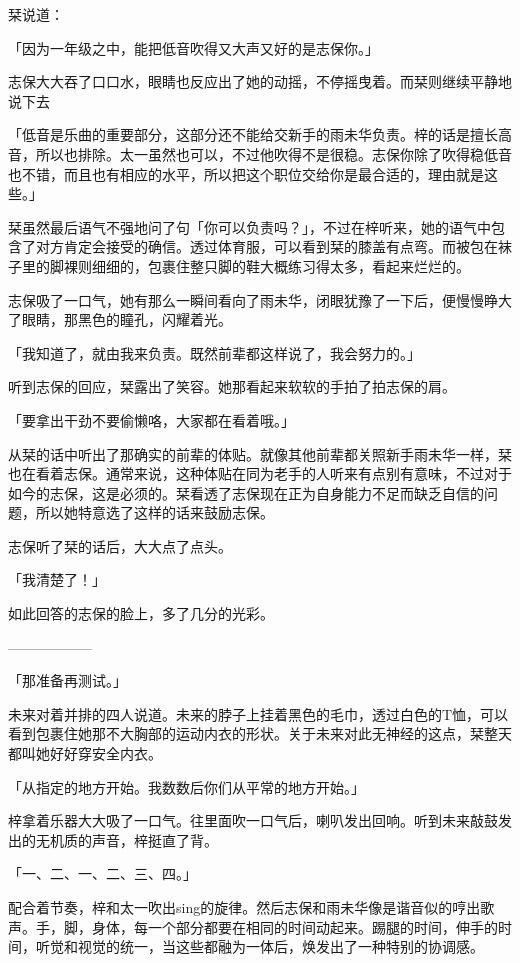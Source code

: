 \documentclass[UTF8]{ctexart}
\begin{document}
    栞说道：

    「因为一年级之中，能把低音吹得又大声又好的是志保你。」

    志保大大吞了口口水，眼睛也反应出了她的动摇，不停摇曳着。而栞则继续平静地说下去

    「低音是乐曲的重要部分，这部分还不能给交新手的雨未华负责。梓的话是擅长高音，所以也排除。太一虽然也可以，不过他吹得不是很稳。志保你除了吹得稳低音也不错，而且也有相应的水平，所以把这个职位交给你是最合适的，理由就是这些。」

    栞虽然最后语气不强地问了句「你可以负责吗？」，不过在梓听来，她的语气中包含了对方肯定会接受的确信。透过体育服，可以看到栞的膝盖有点弯。而被包在袜子里的脚裸则细细的，包裹住整只脚的鞋大概练习得太多，看起来烂烂的。

    志保吸了一口气，她有那么一瞬间看向了雨未华，闭眼犹豫了一下后，便慢慢睁大了眼睛，那黑色的瞳孔，闪耀着光。

    「我知道了，就由我来负责。既然前辈都这样说了，我会努力的。」

    听到志保的回应，栞露出了笑容。她那看起来软软的手拍了拍志保的肩。

    「要拿出干劲不要偷懒咯，大家都在看着哦。」

    从栞的话中听出了那确实的前辈的体贴。就像其他前辈都关照新手雨未华一样，栞也在看着志保。通常来说，这种体贴在同为老手的人听来有点别有意味，不过对于如今的志保，这是必须的。栞看透了志保现在正为自身能力不足而缺乏自信的问题，所以她特意选了这样的话来鼓励志保。

    志保听了栞的话后，大大点了点头。

    「我清楚了！」

    如此回答的志保的脸上，多了几分的光彩。

    ——————

    「那准备再测试。」

    未来对着并排的四人说道。未来的脖子上挂着黑色的毛巾，透过白色的T恤，可以看到包裹住她那不大胸部的运动内衣的形状。关于未来对此无神经的这点，栞整天都叫她好好穿安全内衣。

    「从指定的地方开始。我数数后你们从平常的地方开始。」

    梓拿着乐器大大吸了一口气。往里面吹一口气后，喇叭发出回响。听到未来敲鼓发出的无机质的声音，梓挺直了背。

    「一、二、一、二、三、四。」

    配合着节奏，梓和太一吹出sing的旋律。然后志保和雨未华像是谐音似的哼出歌声。手，脚，身体，每一个部分都要在相同的时间动起来。踢腿的时间，伸手的时间，听觉和视觉的统一，当这些都融为一体后，焕发出了一种特别的协调感。
\end{document}
